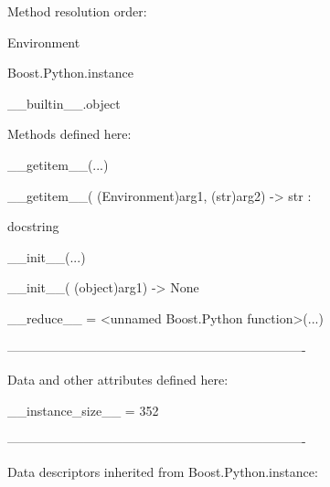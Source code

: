 \documentclass[letterpaper,10pt,english]{sphinxmanual}
\begin{document}
\begin{description}
\begin{description}
\item[{class Environment(Boost.Python.instance)}] \leavevmode
\begin{DUlineblock}{0em}
\item[] Method resolution order:
\item[]
\begin{DUlineblock}{\DUlineblockindent}
\item[] Environment
\item[] Boost.Python.instance
\item[] \_\_builtin\_\_.object
\item[] 
\end{DUlineblock}
\item[] Methods defined here:
\item[] 
\item[] \_\_getitem\_\_(...)
\item[]
\begin{DUlineblock}{\DUlineblockindent}
\item[] \_\_getitem\_\_( (Environment)arg1, (str)arg2) -\textgreater{} str :
\item[]
\begin{DUlineblock}{\DUlineblockindent}
\item[] docstring
\item[] 
\end{DUlineblock}
\end{DUlineblock}
\item[] \_\_init\_\_(...)
\item[]
\begin{DUlineblock}{\DUlineblockindent}
\item[] \_\_init\_\_( (object)arg1) -\textgreater{} None
\item[] 
\end{DUlineblock}
\item[] \_\_reduce\_\_ = \textless{}unnamed Boost.Python function\textgreater{}(...)
\item[] 
\item[] ----------------------------------------------------------------------
\item[] Data and other attributes defined here:
\item[] 
\item[] \_\_instance\_size\_\_ = 352
\item[] 
\item[] ----------------------------------------------------------------------
\item[] Data descriptors inherited from Boost.Python.instance:

\end{DUlineblock}
\end{description}
\end{description}
\end{document}
